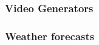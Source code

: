 \begin{frame}
    \frametitle{Video Generators}
    
    \begin{figure}
       \centering
    \end{figure}

\end{frame}

\begin{frame}
    \frametitle{Weather forecasts}
    
    \begin{figure}
       \centering
    \end{figure}

\end{frame}


